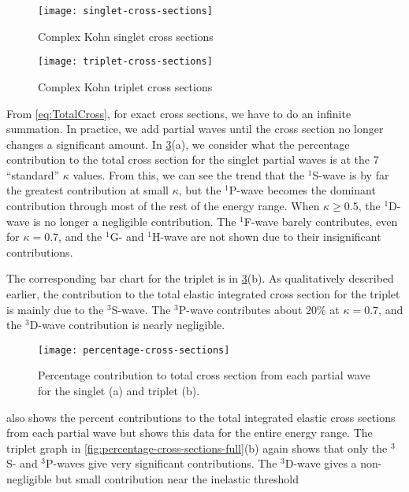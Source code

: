 \documentclass[Dissertation.tex]{subfiles}
\begin{document}
\begin{figure}[H]
	\centering
	\texttt{[image: singlet-cross-sections]}
	\caption{Complex Kohn singlet cross sections}
	\label{fig:singlet-cross-sections}
\end{figure}

\begin{figure}[H]
	\centering
	\texttt{[image: triplet-cross-sections]}
	\caption{Complex Kohn triplet cross sections}
	\label{fig:triplet-cross-sections}
\end{figure}

From \cref{eq:TotalCross}, for exact cross sections, we have to do an infinite
summation. In practice, we add partial waves until the cross section no longer
changes a significant amount. In \cref{fig:percentage-cross-sections}(a), we
consider what the percentage contribution to the total cross section for
the singlet partial waves is at the 7 ``standard'' $\kappa$ values. From this,
we can see the trend that the $^1$S-wave is by far the greatest contribution at
small $\kappa$, but the $^1$P-wave becomes the dominant contribution through
most of the rest of the energy range. When $\kappa \geq 0.5$, the $^1$D-wave is
no longer a negligible contribution. The $^1$F-wave barely contributes, even
for $\kappa = 0.7$, and the $^1$G- and $^1$H-wave are not shown due to their
insignificant contributions.

The corresponding bar chart for the triplet is in
\cref{fig:percentage-cross-sections}(b). As qualitatively described earlier,
the contribution to the total elastic integrated cross section for
the triplet is mainly due to the $^3$S-wave. The $^3$P-wave contributes about
$20\%$ at $\kappa = 0.7$, and the $^3$D-wave contribution is nearly negligible.

\begin{figure}[H]
	\centering
	\texttt{[image: percentage-cross-sections]}
	\caption[Percentage contribution to total cross section]{Percentage contribution to total cross section from each partial wave for the singlet (a) and triplet (b).}
	\label{fig:percentage-cross-sections}
\end{figure}

 also shows the percent contributions to 
the total integrated elastic cross sections from each partial wave but shows
this data for the entire energy range. The triplet graph in
\cref{fig:percentage-cross-sections-full}(b) again shows that only the $^3$S- and
$^3$P-waves give very significant contributions. The $^3$D-wave gives a
non-negligible but small contribution near the inelastic threshold
\end{document}
